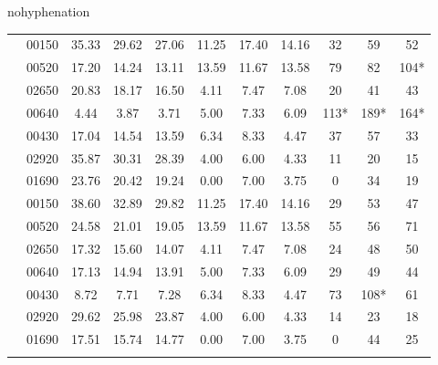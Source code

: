 \begin{hyphenrules}{nohyphenation}
\begin{table}[H]
{\begin{tabular}{>{\raggedleft\arraybackslash}p{4cm} lccCccCccc}
             & 00150 & 35.33 & 29.62 & 27.06 & 11.25 & 17.40 & 14.16 & 32 & 59 & 52 \\
            & 00520 &                       17.20 & 14.24 & 13.11 &     13.59 & 11.67 & 13.58 & 79 & 82 & 104* \\
            & 02650 &                       20.83 & 18.17 & 16.50 &     4.11 & 7.47 & 7.08 &    20 & 41 & 43 \\
            & 00640 &                       4.44 & 3.87 & 3.71 &        5.00 & 7.33 & 6.09 &    113* & 189* & 164* \\
            & 00430 &                       17.04 & 14.54 & 13.59 &     6.34 & 8.33 & 4.47 &    37 & 57 & 33 \\
            & 02920 &                       35.87 & 30.31 & 28.39 &     4.00 & 6.00 & 4.33 &    11 & 20 & 15 \\
            & 01690 &                       23.76 & 20.42 & 19.24 &     0.00 & 7.00 & 3.75 &    0 & 34 & 19 \\
            \midrule
            
             & 00150 & 38.60 & 32.89 & 29.82 & 11.25 & 17.40 & 14.16 & 29 & 53 & 47 \\
            & 00520 &                       24.58 & 21.01 & 19.05 &     13.59 & 11.67 & 13.58 & 55 & 56 & 71 \\
            & 02650 &                       17.32 & 15.60 & 14.07 &     4.11 & 7.47 & 7.08 &    24 & 48 & 50 \\
            & 00640 &                       17.13 & 14.94 & 13.91 &     5.00 & 7.33 & 6.09 &    29 & 49 & 44 \\
            & 00430 &                       8.72 & 7.71 & 7.28 &        6.34 & 8.33 & 4.47 &    73 & 108* & 61 \\
            & 02920 &                       29.62 & 25.98 & 23.87 &     4.00 & 6.00 & 4.33 &    14 & 23 & 18 \\
            & 01690 &                       17.51 & 15.74 & 14.77 &     0.00 & 7.00 & 3.75 &    0 & 44 & 25 \\
            \midrule
            

\end{tabular}}
\end{table}
\end{hyphenrules}
